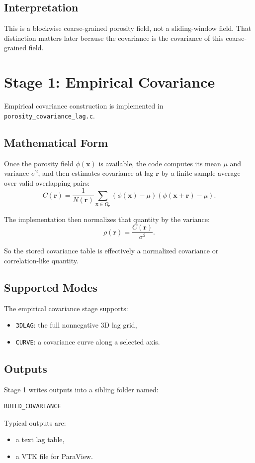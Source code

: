 \documentclass[11pt]{article}
\begin{document}
\subsection{Interpretation}
This is a blockwise coarse-grained porosity field, not a sliding-window field.
That distinction matters later because the covariance is the covariance of this
coarse-grained field.

\section{Stage 1: Empirical Covariance}
Empirical covariance construction is implemented in
\texttt{porosity\_covariance\_lag.c}.

\subsection{Mathematical Form}
Once the porosity field \(\phi(\bm{x})\) is available, the code computes its
mean \(\mu\) and variance \(\sigma^2\), and then estimates covariance at lag
\(\bm{r}\) by a finite-sample average over valid overlapping pairs:
\[
C(\bm{r}) =
\frac{1}{N(\bm{r})}
\sum_{\bm{x}\in\Omega_{\bm{r}}}
(\phi(\bm{x})-\mu)(\phi(\bm{x}+\bm{r})-\mu).
\]

The implementation then normalizes that quantity by the variance:
\[
\rho(\bm{r}) = \frac{C(\bm{r})}{\sigma^2}.
\]

So the stored covariance table is effectively a normalized covariance or
correlation-like quantity.

\subsection{Supported Modes}
The empirical covariance stage supports:
\begin{itemize}
\item \texttt{3DLAG}: the full nonnegative 3D lag grid,
\item \texttt{CURVE}: a covariance curve along a selected axis.
\end{itemize}

\subsection{Outputs}
Stage 1 writes outputs into a sibling folder named:
\begin{verbatim}
BUILD_COVARIANCE
\end{verbatim}

Typical outputs are:
\begin{itemize}
\item a text lag table,
\item a VTK file for ParaView.
\end{itemize}
\end{document}

